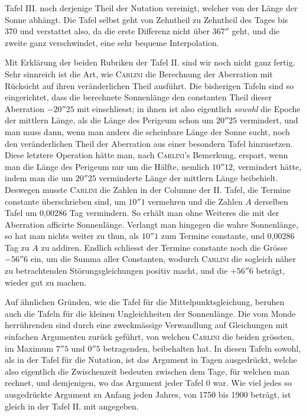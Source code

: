 Tafel III. noch derjenige Theil der Nutation vereinigt, welcher von der Länge der Sonne abhängt. Die Tafel selbst geht von Zehntheil zu Zehntheil des Tages bis 370 und verstattet also, da die erste Differenz nicht über $367''$ geht, und die zweite ganz verschwindet, eine sehr bequeme Interpolation.

Mit Erklärung der beiden Rubriken der Tafel II. sind wir noch nicht ganz fertig. Sehr sinnreich ist die Art, wie \textsc{Carlini} die Berechnung der Aberration mit Rücksicht auf ihren veränderlichen Theil ausführt. Die bisherigen Tafeln sind so eingerichtet, dass die berechnete Sonnenlänge den constanten Theil dieser Aberration $-20''25$ mit einschliesst; in ihnen ist also eigentlich \emph{sowohl} die Epoche der mittlern Länge, als die Länge des Perigeum schon um $20''25$ vermindert, und man muss dann, wenn man anders die scheinbare Länge der Sonne sucht, noch den veränderlichen Theil der Aberration aus einer besondern Tafel hinzusetzen. Diese letztere Operation hätte man, nach \textsc{Carlini}'s Bemerkung, erspart, wenn man die Länge des Perigeum nur um die Hälfte, nemlich $10''12$, vermindert hätte, indem man die um $20''25$ verminderte Länge der mittlern Länge beibehielt. Deswegen musste \textsc{Carlini} die Zahlen in der Columne der II. Tafel, die Termine constante überschrieben sind, um $10''1$ vermehren und die Zahlen $A$ derselben Tafel um 0,00286 Tag vermindern. So erhält man ohne Weiteres die mit der Aberration afficirte Sonnenlänge. Verlangt man hingegen die wahre Sonnenlänge, so hat man nichts weiter zu thun, als $10''1$ zum Termine constante, und 0,00286 Tag zu $A$ zu addiren. Endlich schliesst der Termine constante noch die Grösse $-56''6$ ein, um die Summa aller Constanten, wodurch \textsc{Carlini} die sogleich näher zu betrachtenden Störungsgleichungen positiv macht, und die $+56''6$ beträgt, wieder gut zu machen.

Auf ähnlichen Gründen, wie die Tafel für die Mittelpunktsgleichung, beruhen auch die Tafeln für die kleinen Ungleichheiten der Sonnenlänge. Die vom Monde herrührenden sind durch eine zweckmässige Verwandlung auf Gleichungen mit einfachen Argumenten zurück geführt, von welchen \textsc{Carlini} die beiden grössten, im Maximum $7''5$ und $0''5$ betragenden, beibehalten hat. In diesen Tafeln sowohl, als in der Tafel für die Nutation, ist das Argument in Tagen ausgedrückt, welche also eigentlich die Zwischenzeit bedeuten zwischen dem Tage, für welchen man rechnet, und demjenigen, wo das Argument jeder Tafel 0 war. Wie viel jedes so ausgedrückte Argument zu Anfang jeden Jahres, von 1750 bis 1900 beträgt, ist gleich in der Tafel II. mit angegeben.

